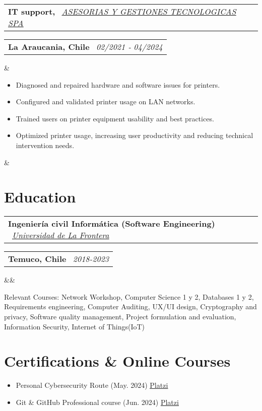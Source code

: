 \documentclass[11pt,a4paper,sans]{moderncv}
\makeatletter
\newcommand{\sectionMargin}{-3mm}
\newcommand*{\customcventry}[7][.13em]{
    \begin{tabular}{@{}l}
    {\bfseries #4} \
    {\itshape #3}
    \end{tabular}
    \hfill
    \begin{tabular}{l@{}}
    {\bfseries #5} \
    {\itshape #2}
    \end{tabular}
    \ifx&#7&%
    \else{\
    \begin{minipage}{\maincolumnwidth}%
    \small#7%
    \end{minipage}}\fi%
    \par\addvspace{#1}
}
\makeatother
\begin{document}
{\customcventry
  {02/2021 ‐ 04/2024}
  {\href{http://www.tisol.cl/}{\underline{ASESORIAS Y GESTIONES TECNOLOGICAS SPA}}}
  {IT support,}
  {La Araucania, Chile}
  {}
  {{\begin{itemize}[leftmargin=0.6cm, noitemsep, label={\textbullet}]
      \item Diagnosed and repaired hardware and software issues for printers.
      \item Configured and validated printer usage on LAN networks.
      \item Trained users on printer equipment usability and best practices.
      \item Optimized printer usage, increasing user productivity and reducing technical intervention needs.
  \end{itemize}
  }
  }
}

\vspace*{\sectionMargin}
\section{Education}
\customcventry
    {2018-2023}
    {\href{https://1drv.ms/b/c/13c8ae619d64655e/EV5lZJ1hrsgggBOHLAAAAAABHh9OZUbWLd2nx7PTa_OSsg?e=Fedmge}{\underline{Universidad de La Frontera}} }
    {Ingeniería civil Informática (Software Engineering)}
    {Temuco, Chile}
    {}{}
    {Relevant Courses: 
        Network Workshop, 
        Computer Science 1 y 2, 
        Databases 1 y 2, 
        Requirements engineering,
        Computer Auditing,
        UX/UI design,
        Cryptography and privacy,
        Software quality management,
        Project formulation and evaluation,
        Information Security,
        Internet of Things(IoT)
}

\vspace*{\sectionMargin}
\section{Certifications \& Online Courses}{
\begin{itemize}[label=\textbullet, noitemsep]
    \item Personal Cybersecurity Route (May. 2024) \href{https://1drv.ms/b/c/13c8ae619d64655e/EZYaMe6SBhJAshtvq4ORCQoBwWMYRerI4_xiuqXjORVd0w?e=I4tLqg}{\underline{Platzi}}
    \item Git \& GitHub Professional course (Jun. 2024) \href{https://1drv.ms/b/c/13c8ae619d64655e/EXeQGPrTCjFDpmx8pCItVTwB-OS1r-tkKJbmgYnahuxtYg?e=akKEsU}{\underline{Platzi}}
\end{itemize}
}
\end{document}
